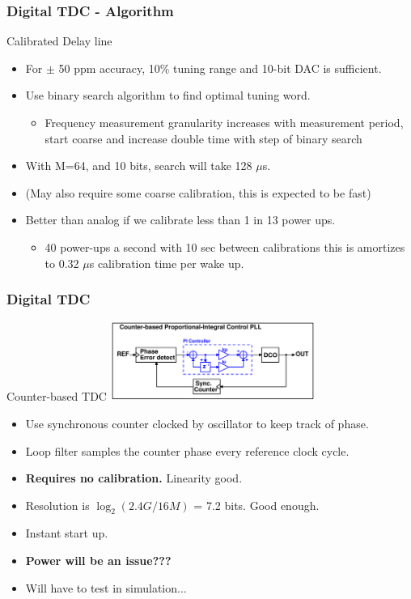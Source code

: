 \documentclass[t, screen, aspectratio=43]{beamer}
\begin{document}
\begin{frame}
	\frametitle{Digital TDC - Algorithm}
	\begin{block}{Calibrated Delay line}
		\begin{itemize}
			\scriptsize

			\item For $\pm$ 50 ppm accuracy, 10\% tuning range and 10-bit DAC is sufficient.
			\item Use binary search algorithm to find optimal tuning word.
			\begin{itemize}
				\scriptsize
				\item Frequency measurement granularity increases with measurement period, start coarse and increase double time with step of binary search
			\end{itemize}		
			\item With M=64, and 10 bits, search will take 128 $\mu$s. 
			\item(May also require some coarse calibration, this is expected to be fast)
			\item Better than analog if we calibrate less than 1 in 13 power ups.
			\begin{itemize}
				\scriptsize
				\item 40 power-ups a second with 10 sec between calibrations this is amortizes to 0.32 $\mu$s  calibration time per wake up. 
			\end{itemize}				
		\end{itemize} 	
	\end{block}
\end{frame}

\begin{frame}
	\frametitle{Digital TDC}
	\begin{block}{Counter-based TDC}
			\vspace{-0.5em}
			\center\includegraphics[width=0.5\textwidth, angle=0]{counter_pll.pdf}	
		\begin{itemize}
			\footnotesize
			\item Use synchronous counter clocked by oscillator to keep track of phase.
			\item Loop filter samples the counter phase every reference clock cycle.
			\item \textbf{Requires no calibration.} Linearity good.
			\item Resolution is $\log_2(2.4G/16M)$ = 7.2 bits. Good enough. 
			\item Instant start up.
			\item \color{red} \textbf{Power will be an issue???}
			\item \color{black} Will have to test in simulation...
		\end{itemize} 	
	\end{block}
\end{frame}
\end{document}

